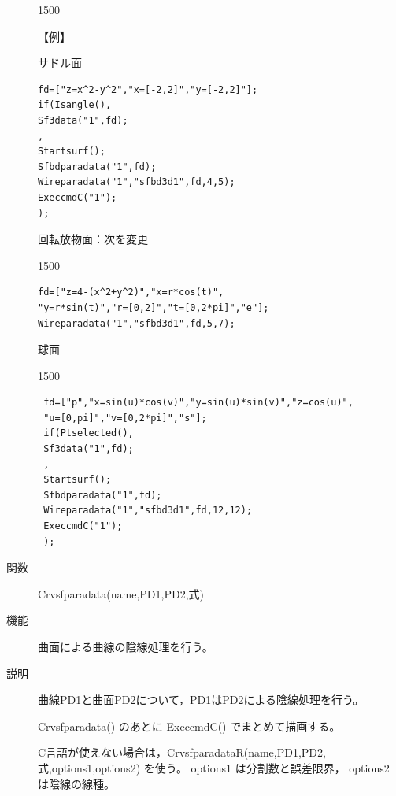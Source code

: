 \documentclass[papersize,a4paper,12pt,uplatex]{jsarticle}
\begin{document}
\begin{description}
\begin{layer}{150}{0}
\end{layer}

【例】

サドル面

\begin{verbatim}
fd=["z=x^2-y^2","x=[-2,2]","y=[-2,2]"];
if(Isangle(),
Sf3data("1",fd);
,
Startsurf();
Sfbdparadata("1",fd);
Wireparadata("1","sfbd3d1",fd,4,5);
ExeccmdC("1");
);
\end{verbatim}

回転放物面：次を変更

\begin{layer}{150}{0}
\end{layer}
\begin{verbatim}
fd=["z=4-(x^2+y^2)","x=r*cos(t)",
"y=r*sin(t)","r=[0,2]","t=[0,2*pi]","e"];
Wireparadata("1","sfbd3d1",fd,5,7);
\end{verbatim}
\vspace{10mm}

球面

\begin{layer}{150}{0}
\end{layer}
\begin{verbatim}
 fd=["p","x=sin(u)*cos(v)","y=sin(u)*sin(v)","z=cos(u)", 
 "u=[0,pi]","v=[0,2*pi]","s"];
 if(Ptselected(),
 Sf3data("1",fd);
 ,
 Startsurf();
 Sfbdparadata("1",fd);
 Wireparadata("1","sfbd3d1",fd,12,12);
 ExeccmdC("1");
 );
\end{verbatim}

\vspace{8mm}

 

\hypertarget{crvsfparadata}{}
\item[関数]Crvsfparadata(name,PD1,PD2,式)
\item[機能]曲面による曲線の陰線処理を行う。
\item[説明]曲線PD1と曲面PD2について，PD1はPD2による陰線処理を行う。

Crvsfparadata() のあとに ExeccmdC() でまとめて描画する。

C言語が使えない場合は，CrvsfparadataR(name,PD1,PD2,式,options1,options2) を使う。
options1 は分割数と誤差限界， options2 は陰線の線種。


\end{description}
\end{document}
